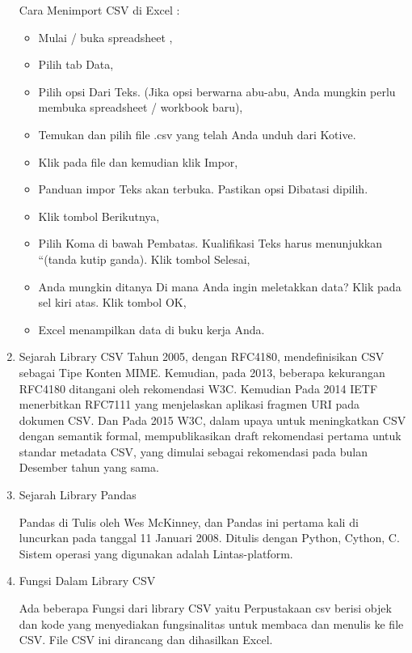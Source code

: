 \begin{enumerate}
Cara Menimport CSV di Excel : \\
\begin{itemize}
\item Mulai / buka spreadsheet ,\\
\item Pilih tab Data,\\
\item Pilih opsi Dari Teks. (Jika opsi berwarna abu-abu, Anda mungkin perlu membuka spreadsheet / workbook baru),\\
\item Temukan dan pilih file .csv yang telah Anda unduh dari Kotive. \item Klik pada file dan kemudian klik Impor,\\
\item Panduan impor Teks akan terbuka. Pastikan opsi Dibatasi dipilih. \item Klik tombol Berikutnya,\\
\item Pilih Koma di bawah Pembatas. Kualifikasi Teks harus menunjukkan “(tanda kutip ganda). Klik tombol Selesai,\\
\item Anda mungkin ditanya Di mana Anda ingin meletakkan data? Klik pada sel kiri atas. Klik tombol OK,\\
\item Excel menampilkan data di buku kerja Anda.
\end{itemize}

\item Sejarah Library CSV
Tahun 2005, dengan RFC4180, mendefinisikan CSV sebagai Tipe Konten MIME. Kemudian, pada 2013, 
beberapa kekurangan RFC4180 ditangani oleh rekomendasi W3C. Kemudian Pada 2014 IETF menerbitkan RFC7111 
yang menjelaskan aplikasi fragmen URI pada dokumen CSV. Dan Pada 2015 W3C, dalam upaya untuk meningkatkan CSV dengan semantik formal, 
mempublikasikan draft rekomendasi pertama untuk standar metadata CSV, yang dimulai sebagai rekomendasi pada bulan Desember tahun yang sama.
\item Sejarah Library Pandas 

Pandas di Tulis oleh  Wes McKinney, dan Pandas ini pertama kali di luncurkan pada tanggal 11 Januari 2008. 
Ditulis dengan Python, Cython, C. Sistem operasi  yang digunakan adalah Lintas-platform.

\item Fungsi Dalam Library CSV

Ada beberapa Fungsi dari library CSV yaitu Perpustakaan csv berisi objek dan kode yang  menyediakan fungsinalitas untuk membaca dan menulis ke file CSV.  
File CSV ini dirancang dan dihasilkan Excel. 


\end{enumerate}

